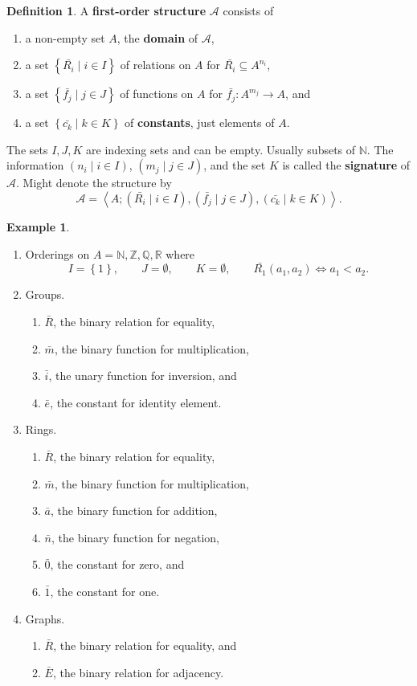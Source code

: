 \documentclass{article}
\newcommand{\N}{\mathbb{N}}
\newcommand{\Z}{\mathbb{Z}}
\newcommand{\Q}{\mathbb{Q}}
\newcommand{\R}{\mathbb{R}}
\newcommand{\rb}[1]{\left( #1 \right)}
\newcommand{\cb}[1]{\left\{ #1 \right\}}
\newcommand{\ab}[1]{\left\langle #1 \right\rangle}
\theoremstyle{definition}\newtheorem{definition}{Definition}[subsection]
\theoremstyle{definition}\newtheorem{remark}[definition]{Remark}
\theoremstyle{definition}\newtheorem*{example}{Example}
\theoremstyle{definition}\newtheorem*{note}{Note}
\begin{document}
\begin{definition}
A \textbf{first-order structure} $ \mathcal{A} $ consists of
\begin{enumerate}
\item a non-empty set $ A $, the \textbf{domain} of $ \mathcal{A} $,
\item a set $ \cb{\bar{R_i} \mid i \in I} $ of relations on $ A $ for $ \bar{R_i} \subseteq A^{n_i} $,
\item a set $ \cb{\bar{f_j} \mid j \in J} $ of functions on $ A $ for $ \bar{f_j} : A^{m_j} \to A $, and
\item a set $ \cb{\bar{c_k} \mid k \in K} $ of \textbf{constants}, just elements of $ A $.
\end{enumerate}
The sets $ I, J, K $ are indexing sets and can be empty. Usually subsets of $ \N $. The information $ \rb{n_i \mid i \in I} $, $ \rb{m_j \mid j \in J} $, and the set $ K $ is called the \textbf{signature} of $ \mathcal{A} $. Might denote the structure by
$$ \mathcal{A} = \ab{A; \rb{\bar{R_i} \mid i \in I}, \rb{\bar{f_j} \mid j \in J}, \rb{\bar{c_k} \mid k \in K}}. $$
\end{definition}

\begin{example}
\hfill
\begin{enumerate}
\item Orderings on $ A = \N, \Z, \Q, \R $ where
$$ I = \cb{1}, \qquad J = \emptyset, \qquad K = \emptyset, \qquad \bar{R_1}\rb{a_1, a_2} \iff a_1 < a_2. $$
\item Groups.
\begin{enumerate}
\item $ \bar{R} $, the binary relation for equality,
\item $ \bar{m} $, the binary function for multiplication,
\item $ \bar{i} $, the unary function for inversion, and
\item $ \bar{e} $, the constant for identity element.
\end{enumerate}
\item Rings.
\begin{enumerate}
\item $ \bar{R} $, the binary relation for equality,
\item $ \bar{m} $, the binary function for multiplication,
\item $ \bar{a} $, the binary function for addition,
\item $ \bar{n} $, the binary function for negation,
\item $ \bar{0} $, the constant for zero, and
\item $ \bar{1} $, the constant for one.
\end{enumerate}
\item Graphs.
\begin{enumerate}
\item $ \bar{R} $, the binary relation for equality, and
\item $ \bar{E} $, the binary relation for adjacency.
\end{enumerate}
\end{enumerate}
\end{example}
\end{document}
